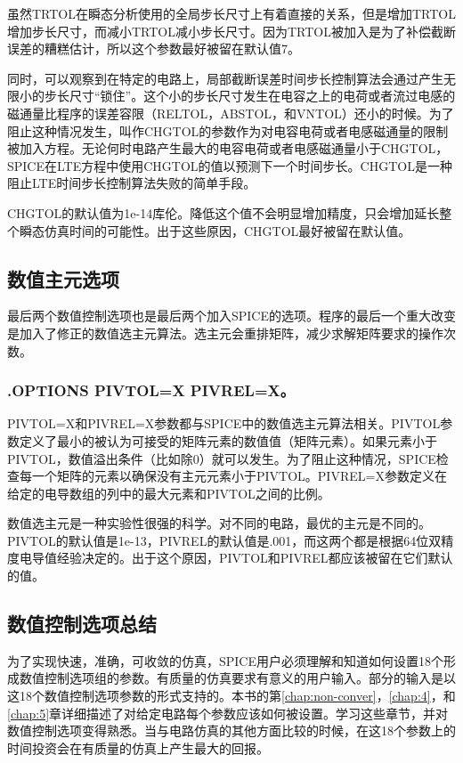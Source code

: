 虽然TRTOL在瞬态分析使用的全局步长尺寸上有着直接的关系，但是增加TRTOL增加步长尺寸，而减小TRTOL减小步长尺寸。因为TRTOL被加入是为了补偿截断误差的糟糕估计，所以这个参数最好被留在默认值7。

同时，可以观察到在特定的电路上，局部截断误差时间步长控制算法会通过产生无限小的步长尺寸“锁住”。这个小的步长尺寸发生在电容之上的电荷或者流过电感的磁通量比程序的误差容限（RELTOL，ABSTOL，和VNTOL）还小的时候。为了阻止这种情况发生，叫作CHGTOL的参数作为对电容电荷或者电感磁通量的限制被加入方程。无论何时电路产生最大的电容电荷或者电感磁通量小于CHGTOL，SPICE在LTE方程中使用CHGTOL的值以预测下一个时间步长。CHGTOL是一种阻止LTE时间步长控制算法失败的简单手段。

CHGTOL的默认值为1e-14库伦。降低这个值不会明显增加精度，只会增加延长整个瞬态仿真时间的可能性。出于这些原因，CHGTOL最好被留在默认值。

\subsection{数值主元选项}
最后两个数值控制选项也是最后两个加入SPICE的选项。程序的最后一个重大改变是加入了修正的数值选主元算法。选主元会重排矩阵，减少求解矩阵要求的操作次数。

\subsubsection{.OPTIONS PIVTOL=X PIVREL=X。}
PIVTOL=X和PIVREL=X参数都与SPICE中的数值选主元算法相关。PIVTOL参数定义了最小的被认为可接受的矩阵元素的数值值（矩阵元素）。如果元素小于PIVTOL，数值溢出条件（比如除0）就可以发生。为了阻止这种情况，SPICE检查每一个矩阵的元素以确保没有主元元素小于PIVTOL。PIVREL=X参数定义在给定的电导数组的列中的最大元素和PIVTOL之间的比例。

数值选主元是一种实验性很强的科学。对不同的电路，最优的主元是不同的。PIVTOL的默认值是1e-13，PIVREL的默认值是.001，而这两个都是根据64位双精度电导值经验决定的。出于这个原因，PIVTOL和PIVREL都应该被留在它们默认的值。

\subsection{数值控制选项总结}
为了实现快速，准确，可收敛的仿真，SPICE用户必须理解和知道如何设置18个形成数值控制选项组的参数。有质量的仿真要求有意义的用户输入。部分的输入是以这18个数值控制选项参数的形式支持的。本书的第\ref{chap:non-conver}，\ref{chap:4}，和\ref{chap:5}章详细描述了对给定电路每个参数应该如何被设置。学习这些章节，并对数值控制选项变得熟悉。当与电路仿真的其他方面比较的时候，在这18个参数上的时间投资会在有质量的仿真上产生最大的回报。

